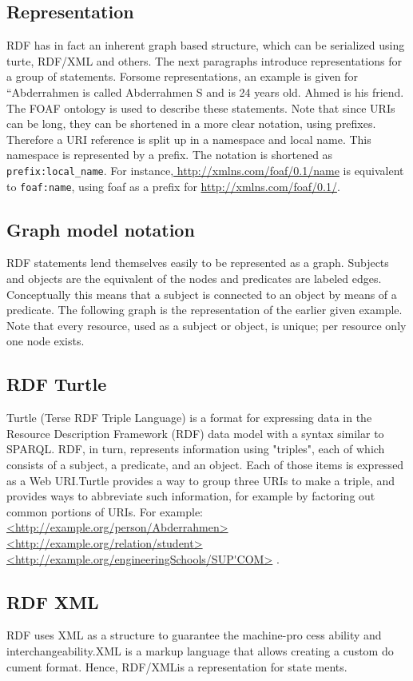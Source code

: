 \documentclass[a4paper,12pt,oneside]{report}
\begin{document}
{{{\subsection{Representation}
{RDF has in fact an inherent graph based structure, which can be serialized using turte, RDF/XML and others. The next paragraphs introduce representations for a group of statements. Forsome representations, an example is given for “Abderrahmen is called Abderrahmen S and is 24 years old. Ahmed is his friend. The FOAF  ontology is used to describe these statements. Note that since URIs can be long, they can be shortened in a more clear notation, using prefixes. Therefore a URI reference is split up in a namespace and local name.
This namespace is represented by a prefix. The notation is shortened as  \verb!prefix:local_name!. For instance,\url{ http://xmlns.com/foaf/0.1/name}  is  equivalent to \verb!foaf:name!, using foaf as a prefix for  \url{http://xmlns.com/foaf/0.1/}.}
\subsection{Graph model notation}
{RDF statements lend themselves easily to be represented as a graph. Subjects and objects are the equivalent of the nodes and predicates are labeled edges. Conceptually this means that a subject is connected to an object by means of a predicate. The following graph is the
representation of the earlier given example. Note that every resource, used as a subject or object, is unique; per resource only one node exists.}
\subsection{RDF Turtle}
{Turtle (Terse RDF Triple Language) is a format for expressing data in the Resource Description Framework (RDF) data model with a syntax similar to SPARQL. RDF, in turn, represents information using "triples", each of which consists of a subject, a predicate, and an object. Each of those items is expressed as a Web URI.Turtle provides a way to group three URIs to make a triple, and provides ways to abbreviate such information, for example by factoring out common portions of URIs. For example:\\
\url{<http://example.org/person/Abderrahmen>} \url{<http://example.org/relation/student>}  \url{<http://example.org/engineeringSchools/SUP'COM>} .}
\subsection{RDF XML}
{RDF uses XML as a structure to guarantee the machine-pro cess ability and interchangeability.XML is a markup language that allows creating a custom do cument format. Hence, RDF/XMLis a representation for state ments.}
}}}
\end{document}
